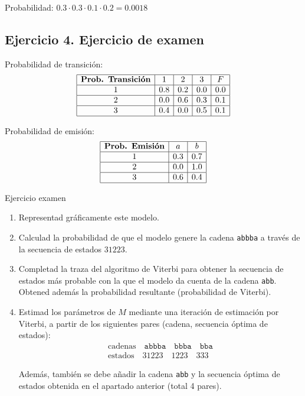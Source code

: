 Probabilidad: $0.3 \cdot 0.3 \cdot 0.1 \cdot 0.2 = 0.0018$

\subsection{Ejercicio 4. Ejercicio de examen}

Probabilidad de transición:
\[
\begin{array}{|c|c|c|c|c|}
\hline
\textbf{Prob. Transición} & 1 & 2 & 3 & F \\ \hline
1 & 0.8 & 0.2 & 0.0 & 0.0 \\ \hline
2 & 0.0 & 0.6 & 0.3 & 0.1 \\ \hline
3 & 0.4 & 0.0 & 0.5 & 0.1 \\ \hline
\end{array}
\]

Probabilidad de emisión:
\[
\begin{array}{|c|c|c|}
\hline
\textbf{Prob. Emisión} & a & b \\ \hline
1 & 0.3 & 0.7 \\ \hline
2 & 0.0 & 1.0 \\ \hline
3 & 0.6 & 0.4 \\ \hline
\end{array}
\]

\begin{exercisebox}{Ejercicio examen}
    \begin{enumerate}[label=\alph*)]
        \item Representad gráficamente este modelo.
        
        \item Calculad la probabilidad de que el modelo genere la cadena \texttt{abbba} a través de la secuencia de estados $31223$.
        
        \item Completad la traza del algoritmo de Viterbi para obtener la secuencia de estados más probable con la que el modelo da cuenta de la cadena \texttt{abb}. Obtened además la probabilidad resultante (probabilidad de Viterbi).
        
        \item Estimad los parámetros de $M$ mediante una iteración de estimación por Viterbi, a partir de los siguientes pares (cadena, secuencia óptima de estados):
        \[
        \begin{array}{l}
        \text{cadenas} \quad \texttt{abbba} \quad \texttt{bbba} \quad \texttt{bba} \\
        \text{estados} \quad 31223 \quad 1223 \quad 333
        \end{array}
        \]
        
        Además, también se debe añadir la cadena \texttt{abb} y la secuencia óptima de estados obtenida en el apartado anterior (total 4 pares).
    \end{enumerate}
\end{exercisebox}

